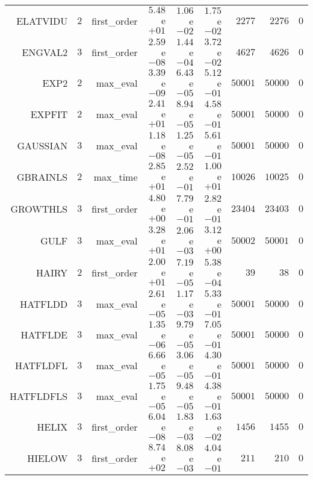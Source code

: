 \begin{longtable}{rrrrrrrrr}
ELATVIDU & \(     2\) & first\_order & \( 5.48\)e\(+01\) & \( 1.06\)e\(-02\) & \( 1.75\)e\(-02\) & \(  2277\) & \(  2276\) & \(     0\) \\
ENGVAL2 & \(     3\) & first\_order & \( 2.59\)e\(-08\) & \( 1.44\)e\(-04\) & \( 3.72\)e\(-02\) & \(  4627\) & \(  4626\) & \(     0\) \\
EXP2 & \(     2\) & max\_eval & \( 3.39\)e\(-09\) & \( 6.43\)e\(-05\) & \( 5.12\)e\(-01\) & \( 50001\) & \( 50000\) & \(     0\) \\
EXPFIT & \(     2\) & max\_eval & \( 2.41\)e\(+01\) & \( 8.94\)e\(-05\) & \( 4.58\)e\(-01\) & \( 50001\) & \( 50000\) & \(     0\) \\
GAUSSIAN & \(     3\) & max\_eval & \( 1.18\)e\(-08\) & \( 1.25\)e\(-05\) & \( 5.61\)e\(-01\) & \( 50001\) & \( 50000\) & \(     0\) \\
GBRAINLS & \(     2\) & max\_time & \( 2.85\)e\(+01\) & \( 2.52\)e\(-01\) & \( 1.00\)e\(+01\) & \( 10026\) & \( 10025\) & \(     0\) \\
GROWTHLS & \(     3\) & first\_order & \( 4.80\)e\(+00\) & \( 7.79\)e\(-01\) & \( 2.82\)e\(-01\) & \( 23404\) & \( 23403\) & \(     0\) \\
GULF & \(     3\) & max\_eval & \( 3.28\)e\(+01\) & \( 2.06\)e\(-03\) & \( 3.12\)e\(+00\) & \( 50002\) & \( 50001\) & \(     0\) \\
HAIRY & \(     2\) & first\_order & \( 2.00\)e\(+01\) & \( 7.19\)e\(-05\) & \( 5.38\)e\(-04\) & \(    39\) & \(    38\) & \(     0\) \\
HATFLDD & \(     3\) & max\_eval & \( 2.61\)e\(-05\) & \( 1.17\)e\(-03\) & \( 5.33\)e\(-01\) & \( 50001\) & \( 50000\) & \(     0\) \\
HATFLDE & \(     3\) & max\_eval & \( 1.35\)e\(-06\) & \( 9.79\)e\(-05\) & \( 7.05\)e\(-01\) & \( 50001\) & \( 50000\) & \(     0\) \\
HATFLDFL & \(     3\) & max\_eval & \( 6.66\)e\(-05\) & \( 3.06\)e\(-05\) & \( 4.30\)e\(-01\) & \( 50001\) & \( 50000\) & \(     0\) \\
HATFLDFLS & \(     3\) & max\_eval & \( 1.75\)e\(-05\) & \( 9.48\)e\(-05\) & \( 4.38\)e\(-01\) & \( 50001\) & \( 50000\) & \(     0\) \\
HELIX & \(     3\) & first\_order & \( 6.04\)e\(-08\) & \( 1.83\)e\(-03\) & \( 1.63\)e\(-02\) & \(  1456\) & \(  1455\) & \(     0\) \\
HIELOW & \(     3\) & first\_order & \( 8.74\)e\(+02\) & \( 8.08\)e\(-03\) & \( 4.04\)e\(-01\) & \(   211\) & \(   210\) & \(     0\) \\

\end{longtable}
